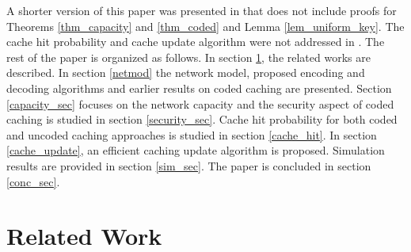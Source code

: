 \documentclass[10pt,journal]{IEEEtran}
\begin{document}
A shorter version of this paper was presented in \cite{DBLP:conf/iccnc/KiskaniS17} that does not include proofs for {Theorems} \ref{thm_capacity} and \ref{thm_coded} and {Lemma} \ref{lem_uniform_key}. The cache hit probability and cache update algorithm were not addressed in \cite{DBLP:conf/iccnc/KiskaniS17}. 
The rest of the paper is organized as follows. In section \ref{related_sec}, the related works are described. In section \ref{netmod} the network model,  proposed encoding and  decoding  algorithms and earlier results on coded caching are presented. Section \ref{capacity_sec} focuses on the network capacity and the security aspect of coded caching is studied in section \ref{security_sec}. Cache hit probability for both coded and uncoded caching approaches is studied in section \ref{cache_hit}. In section \ref{cache_update}, an efficient caching update algorithm is proposed. 
Simulation results are provided in section \ref{sim_sec}. 
The paper is concluded in section \ref{conc_sec}. 

\section{Related Work}
\label{related_sec}
\end{document}

